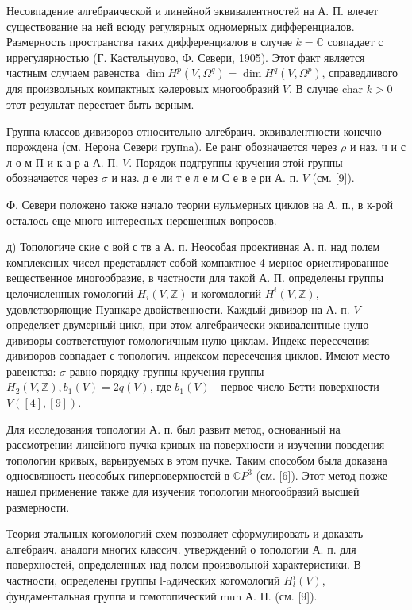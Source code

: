 \documentclass[10pt]{article}
\begin{document}
Несовпадение алгебраической и линейной эквивалентностей на А. П. влечет существование на ней всюду регулярных одномерных дифференциалов. Размерность пространства таких дифференциалов в случае $k=\mathbb{C}$ совпадает с иррегулярностью (Г. Кастельнуово, Ф. Севери, 1905). Этот факт является частным случаем равенства $\operatorname{dim} H^{p}\left(V, \Omega^{q}\right)=\operatorname{dim} H^{q}\left(V, \Omega^{p}\right)$, справедливого для произвольных компактных кәлеровых многообразий $V$. В случае char $k>0$ этот результат перестает быть верным.



Группа классов дивизоров относительно алгебраич. эквивалентности конечно порождена (см. Нерона Севери групna). Ее ранг обозначается через $\rho$ и наз. ч и с л о м П и к а р а А. П. $V$. Порядок подгруппы кручения этой группы обозначается через $\sigma$ и наз. д е ли т е л е м С е в е ри А. п. $V$ (см. [9]).



Ф. Севери положено также начало теории нульмерных циклов на А. п., в к-рой осталось еще много интересных нерешенных вопросов.



д) Топологиче ские с вой с тв а А. п. Неособая проективная А. п. над полем комплексных чисел представляет собой компактное 4-мерное ориентированное вещественное многообразие, в частности для такой А. П. определены группы целочисленных гомологий $H_{i}(V, \mathbb{Z})$ и когомологий $H^{i}(V, \mathbb{Z})$, удовлетворяющие Пуанкаре двойственности. Каждый дивизор на А. п. $V$ определяет двумерный цикл, при әтом алгебраически эквивалентные нулю дивизоры соответствуют гомологичным нулю циклам. Индекс пересечения дивизоров совпадает с топологич. индексом пересечения циклов. Имеют место равенства: $\sigma$ равно порядку группы кручения группы $H_{2}(V, \mathbb{Z}), b_{1}(V)=2 q(V)$, где $b_{1}(V)$ - первое число Бетти поверхности $V([4],[9])$.



Для исследования топологии А. п. был развит метод, основанный на рассмотрении линейного пучка кривых на поверхности и изучении поведения топологии кривых, варьируемых в этом пучке. Таким способом была доказана односвязность неособых гиперповерхностей в $\mathbb{C} P^{3}$ (см. [6]). Этот метод позже нашел применение также для изучения топологии многообразий высшей размерности.



Теория этальных когомологий схем позволяет сформулировать и доказать алгебраич. аналоги многих классич. утверждений о топологии А. п. для поверхностей, определенных над полем произвольной характеристики. В частности, определены группы l-aдических когомологий $H_{l}^{i}(V)$, фундаментальная группа и гомотопический mun А. П. (см. [9]).
\end{document}
